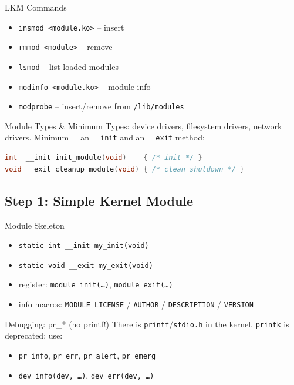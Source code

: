 
\begin{definition}{LKM Commands}
    \begin{itemize}
        \item \texttt{insmod <module.ko>} -- insert
        \item \texttt{rmmod <module>} -- remove
        \item \texttt{lsmod} -- list loaded modules
        \item \texttt{modinfo <module.ko>} -- module info
        \item \texttt{modprobe} -- insert/remove from \texttt{/lib/modules}
    \end{itemize}
\end{definition}

\begin{definition}{Module Types \& Minimum}
    Types: device drivers, filesystem drivers, network drivers. Minimum = an
    \texttt{\_\_init} and an \texttt{\_\_exit} method:
\begin{lstlisting}[language=C, style=basesmol, aboveskip=2pt, belowskip=2pt]
int  __init init_module(void)    { /* init */ }
void __exit cleanup_module(void) { /* clean shutdown */ }
\end{lstlisting}
\end{definition}

\multend

\subsection{Step 1: Simple Kernel Module}


\begin{definition}{Module Skeleton}
    \begin{itemize}
        \item \texttt{static int \_\_init my\_init(void)}
        \item \texttt{static void \_\_exit my\_exit(void)}
        \item register: \texttt{module\_init(\dots)}, \texttt{module\_exit(\dots)}
        \item info macros: \texttt{MODULE\_LICENSE} / \texttt{AUTHOR} /
              \texttt{DESCRIPTION} / \texttt{VERSION}
    \end{itemize}
\end{definition}

\begin{definition}{Debugging: pr\_* (no printf!)}
    There is  \texttt{printf}/\texttt{stdio.h} in the kernel.
    \texttt{printk} is deprecated; use:
    \begin{itemize}
        \item \texttt{pr\_info}, \texttt{pr\_err}, \texttt{pr\_alert}, \texttt{pr\_emerg}
        \item \texttt{dev\_info(dev, \dots)}, \texttt{dev\_err(dev, \dots)}
    \end{itemize}
\end{definition}

